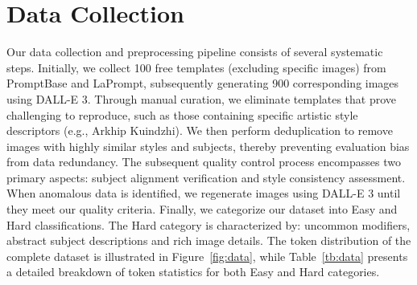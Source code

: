 \section{Data Collection} \label{app_data}
Our data collection and preprocessing pipeline consists of several systematic steps. Initially, we collect 100 free templates (excluding specific images) from PromptBase and LaPrompt, subsequently generating 900 corresponding images using DALL-E 3. Through manual curation, we eliminate templates that prove challenging to reproduce, such as those containing specific artistic style descriptors (e.g., Arkhip Kuindzhi). We then perform deduplication to remove images with highly similar styles and subjects, thereby preventing evaluation bias from data redundancy.
The subsequent quality control process encompasses two primary aspects: subject alignment verification and style consistency assessment. When anomalous data is identified, we regenerate images using DALL-E 3 until they meet our quality criteria. Finally, we categorize our dataset into Easy and Hard classifications. The Hard category is characterized by: uncommon modifiers, abstract subject descriptions and rich image details. The token distribution of the complete dataset is illustrated in Figure~\ref{fig:data}, while Table~\ref{tb:data} presents a detailed breakdown of token statistics for both Easy and Hard categories.


